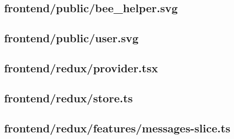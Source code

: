 \subsection*{frontend/public/bee\_helper.svg}


\subsection*{frontend/public/user.svg}


\subsection*{frontend/redux/provider.tsx}


\subsection*{frontend/redux/store.ts}


\subsection*{frontend/redux/features/messages-slice.ts}


